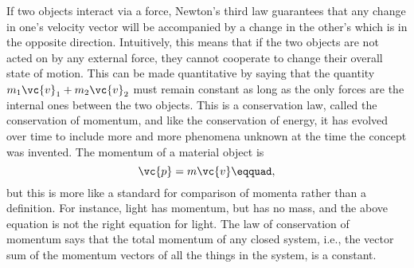 \begin{summary}

\begin{vocab}




\end{vocab}

\begin{notation}



\end{notation}

\begin{othernotation}




\end{othernotation}

\begin{summarytext}

If two objects interact via a force, Newton's third law
guarantees that any change in one's velocity vector will be
accompanied by a change in the other's which is in the
opposite direction. Intuitively, this means that if the two
objects are not acted on by any external force, they cannot
cooperate to change their overall state of motion. This can
be made quantitative by saying that the quantity 
$m_1 \vc{v}_1+m_2 \vc{v}_2$
must remain constant as long as the only forces are the
internal ones between the two objects. This is a conservation
law, called the conservation of momentum, and like the
conservation of energy, it has evolved over time to include
more and more phenomena unknown at the time the concept was
invented. The momentum of a material object is
\begin{equation*}
                \vc{p}  =  m\vc{v}\eqquad,
\end{equation*}
but this is more like a standard for comparison of momenta
rather than a definition. For instance, light has momentum,
but has no mass, and the above equation is not the right
equation for light. The law of conservation of momentum
says that the total momentum of any closed system, i.e., the
vector sum of the momentum vectors of all the things in the
system, is a constant.


\end{summarytext}
\end{summary}
